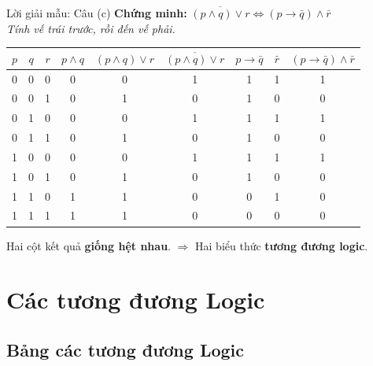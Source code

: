 \documentclass[12pt,a4paper]{article}
\begin{document}
\begin{baitap}{Lời giải mẫu: Câu (c)}
\textbf{Chứng minh:} $\overline{(p \land q) \lor r} \Leftrightarrow (p \to \bar{q}) \land \bar{r}$\\
\textit{Tính vế trái trước, rồi đến vế phải.}

\begin{center}
\renewcommand{\arraystretch}{1.2}
\begin{tabular}{|c|c|c||c|c|c||c|c|c|}
\hline
$p$ & $q$ & $r$ & $p \land q$ & $(p \land q) \lor r$ & $\overline{(p \land q) \lor r}$ & $p \to \bar{q}$ & $\bar{r}$ & $(p \to \bar{q}) \land \bar{r}$ \\ \hline
0 & 0 & 0 & 0 & 0 & \textcolor{AccentRed}{1} & 1 & 1 & \textcolor{AccentRed}{1} \\ \hline
0 & 0 & 1 & 0 & 1 & \textcolor{AccentRed}{0} & 1 & 0 & \textcolor{AccentRed}{0} \\ \hline
0 & 1 & 0 & 0 & 0 & \textcolor{AccentRed}{1} & 1 & 1 & \textcolor{AccentRed}{1} \\ \hline
0 & 1 & 1 & 0 & 1 & \textcolor{AccentRed}{0} & 1 & 0 & \textcolor{AccentRed}{0} \\ \hline
1 & 0 & 0 & 0 & 0 & \textcolor{AccentRed}{1} & 1 & 1 & \textcolor{AccentRed}{1} \\ \hline
1 & 0 & 1 & 0 & 1 & \textcolor{AccentRed}{0} & 1 & 0 & \textcolor{AccentRed}{0} \\ \hline
1 & 1 & 0 & 1 & 1 & \textcolor{AccentRed}{0} & 0 & 1 & \textcolor{AccentRed}{0} \\ \hline
1 & 1 & 1 & 1 & 1 & \textcolor{AccentRed}{0} & 0 & 0 & \textcolor{AccentRed}{0} \\ \hline
\end{tabular}
\end{center}

Hai cột kết quả \textbf{giống hệt nhau}. $\Rightarrow$ Hai biểu thức \textbf{tương đương logic}.
\end{baitap}

\section{Các tương đương Logic}

\subsection{Bảng các tương đương Logic}
\end{document}
